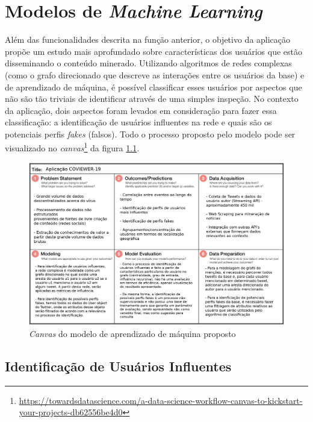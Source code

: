 \chapter{Modelos de \textit{Machine Learning}}


Além das funcionalidades descrita na função anterior, o objetivo da aplicação propõe um estudo mais aprofundado sobre características dos usuários que estão disseminando o conteúdo minerado. Utilizando algoritmos de redes complexas (como o grafo direcionado que descreve as interações entre os usuários da base) e de aprendizado de máquina, é possível classificar esses usuários por aspectos que não são tão triviais de identificar através de uma simples inspeção. No contexto da aplicação, dois aspectos foram levados em consideração para fazer essa classificação: a identificação de usuários influentes na rede e quais são os potenciais perfis \textit{fakes} (falsos). Todo o processo proposto pelo modelo pode ser visualizado no \textit{canvas}\footnote{\href{https://towardsdatascience.com/a-data-science-workflow-canvas-to-kickstart-your-projects-db62556be4d0}{https://towardsdatascience.com/a-data-science-workflow-canvas-to-kickstart-your-projects-db62556be4d0}} da figura \ref{fig:canvas}.

\begin{figure}[!htb]
\centering
\includegraphics[width=16cm]{img/20.png}
\caption[Caption for LOF]{ \textit{Canvas} do modelo de aprendizado de máquina proposto }
\label{fig:canvas}
\end{figure}


\section{Identificação de Usuários Influentes}

